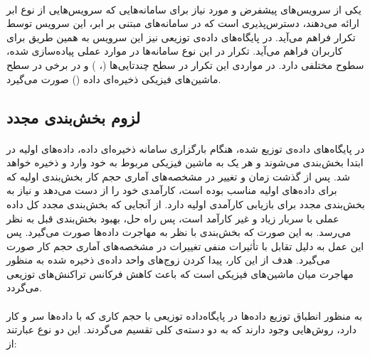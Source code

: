 \paragraph*{}
یکی از سرویس‌های پیشفرض و مورد نیاز برای سامانه‌هایی که سرویس‌هایی از نوع ابر ارائه می‌دهند، دسترس‌پذیری است که در سامانه‌های مبتنی بر ابر، این سرویس توسط تکرار فراهم می‌آید.
\cite{velte-2010}
در پایگاه‌های داده‌ی توزیعی نیز این سرویس به همین طریق برای کاربران فراهم می‌آید. تکرار در این نوع سامانه‌ها در موارد عملی پیاده‌سازی شده، سطوح مختلفی دارد. در مواردی این تکرار در سطح چندتایی‌ها
(\cite{schism-2010}، \cite{sword-2013})
و در برخی در سطح ماشین‌های فیزیکی ذخیره‌ای داده
(\cite{kamal-2016})
صورت می‌گیرد.

\subsection{لزوم بخش‌بندی مجدد}
\paragraph*{}
در پایگاه‌های داده‌ی توزیع شده، هنگام بارگزاری سامانه ذخیره‌ای داده، داده‌های اولیه در ابتدا بخش‌بندی می‌شوند و هر یک به ماشین فیزیکی مربوط به خود وارد و ذخیره خواهد شد. پس از گذشت زمان و تغییر در مشخصه‌های آماری حجم کار بخش‌بندی اولیه که برای داده‌های اولیه مناسب بوده است، کارآمدی خود را از دست می‌دهد و نیاز به بخش‌بندی مجدد برای بازیابی کارآمدی اولیه دارد. از آنجایی که بخش‌بندی مجدد کل داده عملی با سربار زیاد و غیر کارآمد است، پس راه حل، بهبود بخش‌بندی قبل به نظر می‌رسد. به این صورت که بخش‌بندی با نظر به مهاجرت داده‌ها صورت می‌گیرد. پس این عمل به دلیل تقابل با تأثیرات منفی تغییرات در مشخصه‌های آماری حجم کار صورت می‌گیرد. هدف از این کار، پیدا کردن زوج‌های واحد داده‌ی ذخیره شده به منظور مهاجرت میان ماشین‌های فیزیکی است که باعث کاهش فرکانس تراکنش‌های توزیعی می‌گردد.
\cite{sword-2013}

\paragraph*{}
به منظور انطباق توزیع داده‌ها در پایگاه‌داده توزیعی با حجم کاری که با داده‌ها سر و کار دارد، روش‌هایی وجود دارند که به دو دسته‌ی کلی تقسیم می‌گردند.
\cite{kamal-2016}
این دو نوع عبارتند از:

